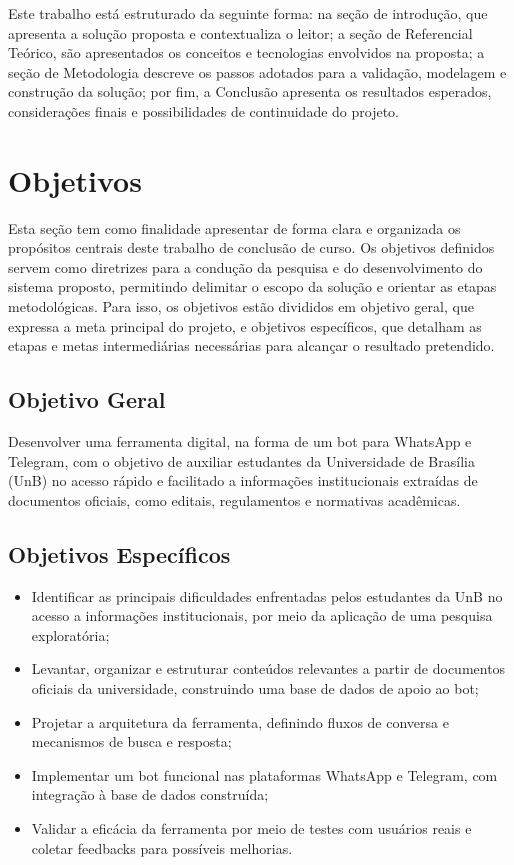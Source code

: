 Este trabalho está estruturado da seguinte forma: na seção de introdução, que apresenta a solução proposta e contextualiza o leitor; a seção de Referencial Teórico, são apresentados os conceitos e tecnologias envolvidos na proposta; a seção de Metodologia descreve os passos adotados para a validação, modelagem e construção da solução; por fim, a Conclusão apresenta os resultados esperados, considerações finais e possibilidades de continuidade do projeto.

\section{Objetivos}

Esta seção tem como finalidade apresentar de forma clara e organizada os propósitos centrais deste trabalho de conclusão de curso. Os objetivos definidos servem como diretrizes para a condução da pesquisa e do desenvolvimento do sistema proposto, permitindo delimitar o escopo da solução e orientar as etapas metodológicas. Para isso, os objetivos estão divididos em objetivo geral, que expressa a meta principal do projeto, e objetivos específicos, que detalham as etapas e metas intermediárias necessárias para alcançar o resultado pretendido.

\subsection{Objetivo Geral}

Desenvolver uma ferramenta digital, na forma de um bot para WhatsApp e Telegram, com o objetivo de auxiliar estudantes da Universidade de Brasília (UnB) no acesso rápido e facilitado a informações institucionais extraídas de documentos oficiais, como editais, regulamentos e normativas acadêmicas.

\subsection{Objetivos Específicos}

\begin{itemize}
    \item Identificar as principais dificuldades enfrentadas pelos estudantes da UnB no acesso a informações institucionais, por meio da aplicação de uma pesquisa exploratória;
    
    \item Levantar, organizar e estruturar conteúdos relevantes a partir de documentos oficiais da universidade, construindo uma base de dados de apoio ao bot;
    
    \item Projetar a arquitetura da ferramenta, definindo fluxos de conversa e mecanismos de busca e resposta;
    
    \item Implementar um bot funcional nas plataformas WhatsApp e Telegram, com integração à base de dados construída;
    
    \item Validar a eficácia da ferramenta por meio de testes com usuários reais e coletar feedbacks para possíveis melhorias.
\end{itemize}

